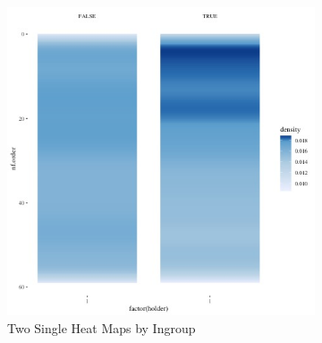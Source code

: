 \documentclass[12pt,letterpaper]{article}
\begin{document}

\begin{figure}[ht]

    \begin{subfigure}{.5\textwidth} 
        \centering
        \includegraphics[width=1\linewidth]{Output/Graphs/Audit/Heatmaps/US NF nf rank by ingroup - smooth.jpg}  
        \caption{Two Single Heat Maps by Ingroup}
        \label{fig:sub-first}
        \end{subfigure}
    \begin{subfigure}{.5\textwidth}
        \centering

\end{subfigure}
\end{figure}
\end{document}
